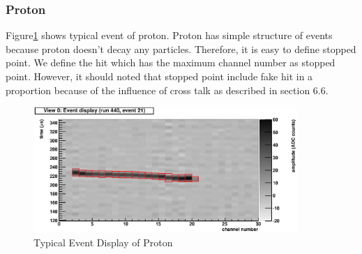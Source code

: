 \subsubsection{Proton}

Figure\ref{fig:Proton_Event_Display} shows typical event of proton.
Proton has simple structure of events because proton doesn't decay any particles.
Therefore, it is easy to define stopped point.
We define the hit which has the maximum channel number as stopped point.
However, it should noted that stopped point include fake hit in a proportion because of the influence of cross talk as described in section 6.6.\\

\begin{figure}[htbp]
  \centering
  \includegraphics[width=10cm,clip]{fig/Display_run440_ev21.eps}
  \caption{Typical Event Display of Proton}
  \label{fig:Proton_Event_Display}
\end{figure}
